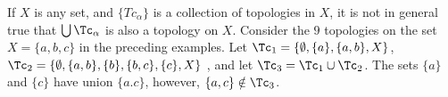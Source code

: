 \begin{example}\label{1.3}
    If $X$ is any set, and  $\{Tc_\alpha\}$ is a collection of topologies in
    $X$, it is not in general true that  $\bigcup{\Tc_\alpha}$ is also a
    topology on $X$. Consider the  $9$ topologies on the set  $X=\{a,b,c\}$ in
    the preceding examples. Let $\Tc_1=\{\emptyset, \{a\}, \{a,b\},X\}$,
    $\Tc_2=\{\emptyset, \{a,b\}, \{b\}, \{b,c\}, \{c\}, X\}$ , and let
    $\Tc_3=\Tc_1 \cup \Tc_2$. The sets $\{a\}$ and $\{c\}$ have union $\{a.c\}$,
    however, $\{a,c\} \notin \Tc_3$.
\end{example}
